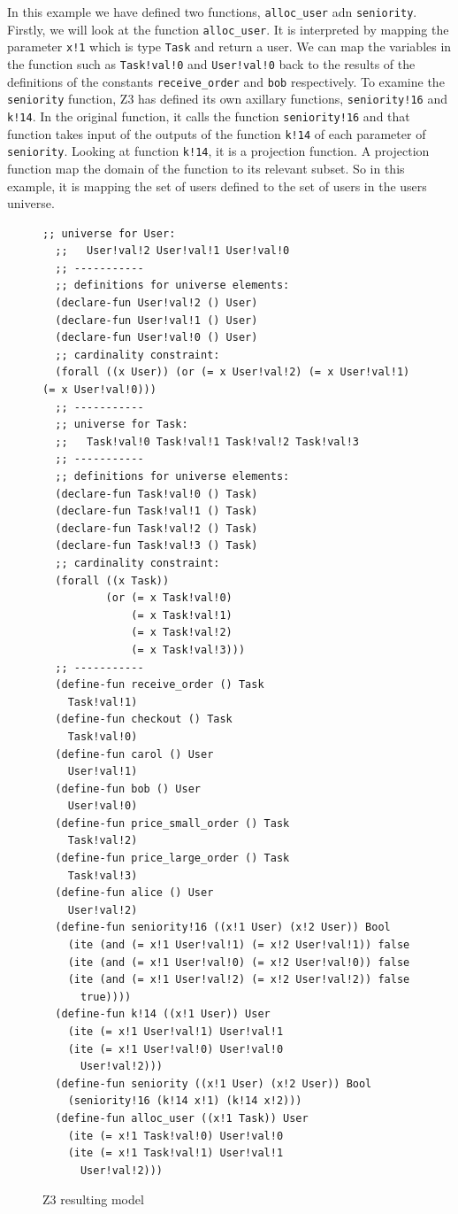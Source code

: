 \documentclass[a4paper]{report}
\begin{document}
In this example we have defined two functions, \texttt{alloc\_user} adn \texttt{seniority}. Firstly, we will look at the function \texttt{alloc\_user}. It is interpreted by mapping the parameter \texttt{x!1} which is type \texttt{Task} and return a user. We can map the variables in the function such as \texttt{Task!val!0} and \texttt{User!val!0} back to the results of the definitions of the constants \texttt{receive\_order} and \texttt{bob} respectively. To examine the \texttt{seniority} function, Z3 has defined its own axillary functions, \texttt{seniority!16} and \texttt{k!14}. In the original function, it calls the function \texttt{seniority!16} and that function takes input of the outputs of the function \texttt{k!14} of each parameter of \texttt{seniority}. Looking at function \texttt{k!14}, it is a projection function. A projection function map the domain of the function to its relevant subset. So in this example, it is mapping the set of users defined to the set of users in the users universe\cite{Z3Interpreter}.\\

\begin{figure}[!h]
\lstset{basicstyle=\ttfamily}
\begin{lstlisting}[frame=single]
  ;; universe for User:
  ;;   User!val!2 User!val!1 User!val!0 
  ;; -----------
  ;; definitions for universe elements:
  (declare-fun User!val!2 () User)
  (declare-fun User!val!1 () User)
  (declare-fun User!val!0 () User)
  ;; cardinality constraint:
  (forall ((x User)) (or (= x User!val!2) (= x User!val!1) (= x User!val!0)))
  ;; -----------
  ;; universe for Task:
  ;;   Task!val!0 Task!val!1 Task!val!2 Task!val!3 
  ;; -----------
  ;; definitions for universe elements:
  (declare-fun Task!val!0 () Task)
  (declare-fun Task!val!1 () Task)
  (declare-fun Task!val!2 () Task)
  (declare-fun Task!val!3 () Task)
  ;; cardinality constraint:
  (forall ((x Task))
          (or (= x Task!val!0)
              (= x Task!val!1)
              (= x Task!val!2)
              (= x Task!val!3)))
  ;; -----------
  (define-fun receive_order () Task
    Task!val!1)
  (define-fun checkout () Task
    Task!val!0)
  (define-fun carol () User
    User!val!1)
  (define-fun bob () User
    User!val!0)
  (define-fun price_small_order () Task
    Task!val!2)
  (define-fun price_large_order () Task
    Task!val!3)
  (define-fun alice () User
    User!val!2)
  (define-fun seniority!16 ((x!1 User) (x!2 User)) Bool
    (ite (and (= x!1 User!val!1) (= x!2 User!val!1)) false
    (ite (and (= x!1 User!val!0) (= x!2 User!val!0)) false
    (ite (and (= x!1 User!val!2) (= x!2 User!val!2)) false
      true))))
  (define-fun k!14 ((x!1 User)) User
    (ite (= x!1 User!val!1) User!val!1
    (ite (= x!1 User!val!0) User!val!0
      User!val!2)))
  (define-fun seniority ((x!1 User) (x!2 User)) Bool
    (seniority!16 (k!14 x!1) (k!14 x!2)))
  (define-fun alloc_user ((x!1 Task)) User
    (ite (= x!1 Task!val!0) User!val!0
    (ite (= x!1 Task!val!1) User!val!1
      User!val!2)))
\end{lstlisting}
\caption{Z3 resulting model}
\label{fig:Z3 result and model}
\end{figure}
\end{document}
